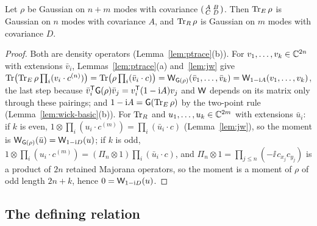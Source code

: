 \begin{theorem}\label{thm:marginal}
Let $\rho$ be Gaussian on $n+m$ modes with covariance $\begin{psmallmatrix}A&B\\C&D\end{psmallmatrix}$.
Then $\operatorname{Tr}_{E}\rho$ is Gaussian on $n$ modes with covariance $A$, and $\operatorname{Tr}_{R}\rho$ is Gaussian on
$m$ modes with covariance $D$.
\end{theorem}
\begin{proof}
Both are density operators (Lemma~\ref{lem:ptrace}(b)). For $v_1,\ldots,v_k\in\mathbb C^{2n}$ with
extensions $\bar v_i$, Lemmas~\ref{lem:ptrace}(a) and~\ref{lem:jw} give
$\operatorname{Tr}\bigl(\operatorname{Tr}_{E}\rho\prod_i(v_i\cdot c^{(n)})\bigr)=\operatorname{Tr}\bigl(\rho\prod_i(\bar v_i\cdot c)\bigr)
=\mathsf W_{\mathsf G(\rho)}(\bar v_1,\ldots,\bar v_k)=\mathsf W_{1-\mathrm i A}(v_1,\ldots,v_k)$, the last step because
$\bar v_i^{\mathsf T}\mathsf G(\rho)\bar v_j=v_i^{\mathsf T}(1-\mathrm i A)v_j$ and $\mathsf W$ depends on its matrix only through
these pairings; and $1-\mathrm i A=\mathsf G(\operatorname{Tr}_{E}\rho)$ by the two-point rule
(Lemma~\ref{lem:wick-basic}(b)). For $\operatorname{Tr}_{R}$ and $u_1,\ldots,u_k\in\mathbb C^{2m}$ with extensions
$\bar u_i$: if $k$ is even, $1\otimes\prod_i(u_i\cdot c^{(m)})=\prod_i(\bar u_i\cdot c)$
(Lemma~\ref{lem:jw}), so the moment is $\mathsf W_{\mathsf G(\rho)}(\bar u)=\mathsf W_{1-\mathrm i D}(u)$; if $k$ is odd,
$1\otimes\prod_i(u_i\cdot c^{(m)})=(\Pi_n\otimes1)\prod_i(\bar u_i\cdot c)$, and
$\Pi_n\otimes1=\prod_{j\leq n}(-\ii\,c_{x_j}c_{y_j})$ is a product of $2n$ retained Majorana
operators, so the moment is a moment of $\rho$ of odd length $2n+k$, hence $0=\mathsf W_{1-\mathrm i D}(u)$.
\end{proof}

\subsection{The defining relation}
\label{sec:relation}

